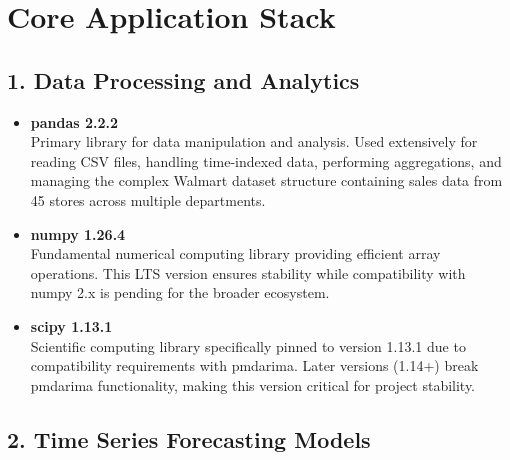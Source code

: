 \section*{Core Application Stack}

\subsection*{1. Data Processing and Analytics}

\begin{itemize}
	\item \textbf{pandas 2.2.2} \\
	Primary library for data manipulation and analysis. Used extensively for reading CSV files, handling time-indexed data, performing aggregations, and managing the complex Walmart dataset structure containing sales data from 45 stores across multiple departments.
	
	\item \textbf{numpy 1.26.4} \\
	Fundamental numerical computing library providing efficient array operations. This LTS version ensures stability while compatibility with numpy 2.x is pending for the broader ecosystem.
	
	\item \textbf{scipy 1.13.1} \\
	Scientific computing library specifically pinned to version 1.13.1 due to compatibility requirements with pmdarima. Later versions (1.14+) break pmdarima functionality, making this version critical for project stability.
\end{itemize}

\subsection*{2. Time Series Forecasting Models}


